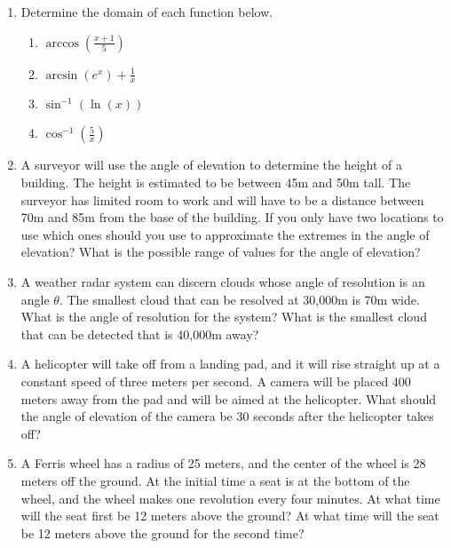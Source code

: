 
\begin{enumerate}
\item Determine the domain of each function below.
  \begin{enumerate}
  \item ${\displaystyle \arccos\left(\frac{x+1}{5}\right) }$
  \item ${\displaystyle \arcsin\left(e^x\right) + \frac{1}{x}}$
  \item ${\displaystyle \sin^{-1}\left( \ln(x) \right) }$
  \item ${\displaystyle \cos^{-1}\left( \frac{5}{x} \right)  }$
  \end{enumerate}
\item A surveyor will use the angle of elevation to determine the
  height of a building. The height is estimated to be between 45m and
  50m tall. The surveyor has limited room to work and will have to be
  a distance between 70m and 85m from the base of the building. If you
  only have two locations to use which ones should you use to
  approximate the extremes in the angle of elevation? What is the
  possible range of values for the angle of elevation?
\item A weather radar system can discern clouds whose angle of
  resolution is an angle $\theta$. The smallest cloud that can be
  resolved at 30,000m is 70m wide. What is the angle of resolution for
  the system? What is the smallest cloud that can be detected that is
  40,000m away?


\item A helicopter will take off from a landing pad, and it will rise
  straight up at a constant speed of three meters per second. A camera
  will be placed 400 meters away from the pad and will be aimed at the
  helicopter. What should the angle of elevation of the camera be 30
  seconds after the helicopter takes off?

\item A Ferris wheel has a radius of 25 meters, and the center of the
  wheel is 28 meters off the ground. At the initial time a seat is at
  the bottom of the wheel, and the wheel makes one revolution every
  four minutes. At what time will the seat first be 12 meters above
  the ground? At what time will the seat be 12 meters above the ground
  for the second time?

\end{enumerate}
